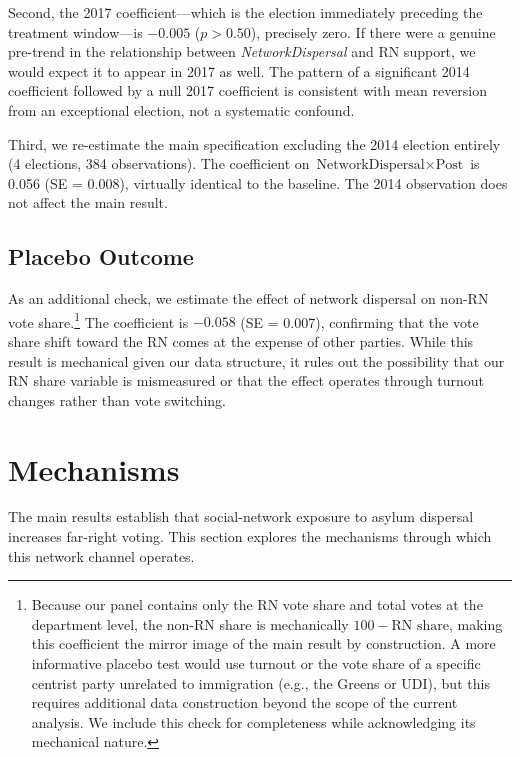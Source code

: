 \documentclass[12pt]{article}
\begin{document}
Second, the 2017 coefficient---which is the election immediately preceding the treatment window---is $-0.005$ ($p > 0.50$), precisely zero. If there were a genuine pre-trend in the relationship between \textit{NetworkDispersal} and RN support, we would expect it to appear in 2017 as well. The pattern of a significant 2014 coefficient followed by a null 2017 coefficient is consistent with mean reversion from an exceptional election, not a systematic confound.

Third, we re-estimate the main specification excluding the 2014 election entirely (4 elections, 384 observations). The coefficient on $\text{NetworkDispersal} \times \text{Post}$ is 0.056 (SE = 0.008), virtually identical to the baseline. The 2014 observation does not affect the main result.

\subsection{Placebo Outcome}

As an additional check, we estimate the effect of network dispersal on non-RN vote share.\footnote{Because our panel contains only the RN vote share and total votes at the department level, the non-RN share is mechanically $100 - \text{RN share}$, making this coefficient the mirror image of the main result by construction. A more informative placebo test would use turnout or the vote share of a specific centrist party unrelated to immigration (e.g., the Greens or UDI), but this requires additional data construction beyond the scope of the current analysis. We include this check for completeness while acknowledging its mechanical nature.} The coefficient is $-0.058$ (SE = 0.007), confirming that the vote share shift toward the RN comes at the expense of other parties. While this result is mechanical given our data structure, it rules out the possibility that our RN share variable is mismeasured or that the effect operates through turnout changes rather than vote switching.

\section{Mechanisms}
\label{sec:mechanisms}

The main results establish that social-network exposure to asylum dispersal increases far-right voting. This section explores the mechanisms through which this network channel operates.
\end{document}
